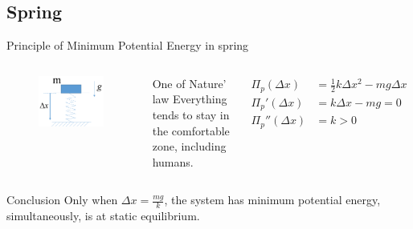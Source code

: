 \documentclass[11pt]{beamer}
\begin{document}
\subsection{Spring}
\begin{frame}{Principle of Minimum Potential Energy in spring}
\begin{columns}
\begin{figure}
\centering
\includegraphics[width=0.6\linewidth]{source/spring}
\end{figure}
\begin{block}{One of Nature' law}
Everything tends to stay in the comfortable zone, including humans.
\end{block}
\begin{block}{}
\begin{align*}
\Pi_p(\Delta x)&= \frac{1}{2}k\Delta x^2-mg\Delta x\\
\Pi_p'(\Delta x)&= k\Delta x-mg=0 \\
\Pi_p''(\Delta x)&= k>0
\end{align*}
\end{block}
\end{columns}
\begin{block}{Conclusion}
Only when $\Delta x = \frac{mg}{k}$, the system has minimum potential energy, simultaneously, is at static equilibrium.
\end{block}
\end{frame}
\end{document}
